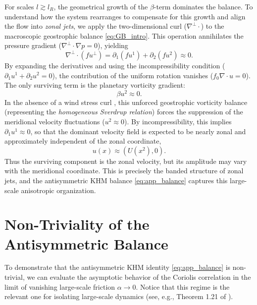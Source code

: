 \documentclass[11pt,a4paper]{article}
\numberwithin{equation}{section}
\numberwithin{theorem}{section}
\numberwithin{remark}{section}
\numberwithin{definition}{section}
\begin{document}
For scales $l \gtrsim l_R$, the geometrical growth of the $\beta$-term dominates the balance. To understand how the system rearranges to compensate for this growth and align the flow into \textit{zonal jets}, we apply the two-dimensional curl ($\nabla^\perp \cdot$) to the macroscopic geostrophic balance \eqref{eq:GB_intro}. This operation annihilates the pressure gradient ($\nabla^\perp \cdot \nabla p = 0$), yielding
\begin{equation}
    \nabla^\perp \cdot (f u^\perp) = \partial_1 (f u^1) + \partial_2 (f u^2) \approx 0.
\end{equation}
By expanding the derivatives and using the incompressibility condition ($\partial_1 u^1 + \partial_2 u^2 = 0$), the contribution of the uniform rotation vanishes ($f_0 \nabla \cdot u = 0$). The only surviving term is the planetary vorticity gradient:
\begin{equation}\label{eq:supp}
    \beta u^2 \approx 0.
\end{equation}
In the absence of a wind stress curl \cite{vallis1}, this unforced geostrophic vorticity balance (representing the \textit{homogeneous Sverdrup relation}) forces the suppression of the meridional velocity fluctuations ($u^2 \approx 0$). By incompressibility, this implies $\partial_1 u^1 \approx 0$, so that the dominant velocity field is expected to be nearly zonal and approximately independent of the zonal coordinate,
\begin{equation}
    u(x) \approx (U(x^2),0).
\end{equation}
Thus the surviving component is the zonal velocity, but its amplitude may vary 
with the meridional coordinate. This is precisely the banded structure of zonal 
jets, and the antisymmetric KHM balance \eqref{eq:app_balance} captures this 
large-scale anisotropic organization.


\section{Non-Triviality of the Antisymmetric Balance}\label{appB} 
To  demonstrate that the antisymmetric KHM identity \eqref{eq:app_balance} is non-trivial, we can evaluate the asymptotic behavior of the Coriolis correlation in the limit of vanishing large-scale friction $\alpha \to 0$. Notice that this regime is the relevant one for isolating large-scale dynamics (see, e.g., Theorem 1.21 of \cite{bed2D}). 
\end{document}
